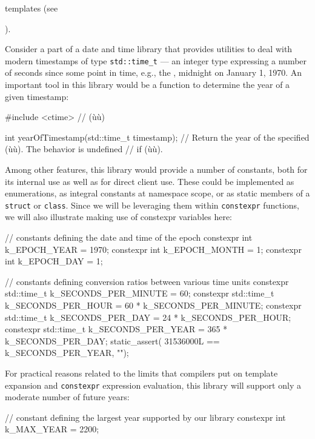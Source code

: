 templates (see {).

Consider a part of a date and time library that provides utilities to
deal with modern timestamps of type \lstinline!std::time_t! --- an integer
type expressing a number of seconds since some point in time, e.g., the
, midnight on January 1, 1970. An important tool in
this library would be a function to determine the year of a given
timestamp:

\begin{emcppslisting}[emcppsbatch=e14]
#include <ctime>  // (ù{}ù)

int yearOfTimestamp(std::time_t timestamp);
    // Return the year of the specified (ù{}ù). The behavior is undefined
    // if (ù{}ù).
\end{emcppslisting}
    

\noindent Among other features, this library would provide a number of constants,
both for its internal use as well as for direct client use. These could
be implemented as enumerations, as integral constants at namespace
scope, or as static members of a \lstinline!struct! or \lstinline!class!.
Since we will be leveraging them within \lstinline!constexpr! functions, we
will also illustrate making use of constexpr variables here:

\begin{emcppslisting}[emcppsbatch=e14]
// constants defining the date and time of the epoch
constexpr int k_EPOCH_YEAR  = 1970;
constexpr int k_EPOCH_MONTH = 1;
constexpr int k_EPOCH_DAY   = 1;

// constants defining conversion ratios between various time units
constexpr std::time_t k_SECONDS_PER_MINUTE = 60;
constexpr std::time_t k_SECONDS_PER_HOUR   = 60  * k_SECONDS_PER_MINUTE;
constexpr std::time_t k_SECONDS_PER_DAY    = 24  * k_SECONDS_PER_HOUR;
constexpr std::time_t k_SECONDS_PER_YEAR   = 365 * k_SECONDS_PER_DAY;
static_assert( 31536000L == k_SECONDS_PER_YEAR, "");
\end{emcppslisting}
    

\noindent For practical reasons related to the limits that compilers put on
template expansion and \lstinline!constexpr! expression evaluation, this
library will support only a moderate number of future years:

\begin{emcppslisting}[emcppsbatch=e14]
// constant defining the largest year supported by our library
constexpr int k_MAX_YEAR = 2200;
\end{emcppslisting}
    

}
